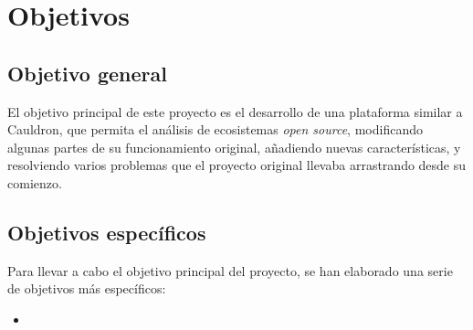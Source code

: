 
\section{Objetivos}

\subsection{Objetivo general}

El objetivo principal de este proyecto es el desarrollo de una plataforma similar a Cauldron, que permita el análisis de ecosistemas \emph{open source}, modificando algunas partes de su funcionamiento original, añadiendo nuevas características, y resolviendo varios problemas que el proyecto original llevaba arrastrando desde su comienzo.

\subsection{Objetivos específicos}

Para llevar a cabo el objetivo principal del proyecto, se han elaborado una serie de objetivos más específicos:

\begin{itemize}
    \item
\end{itemize}
